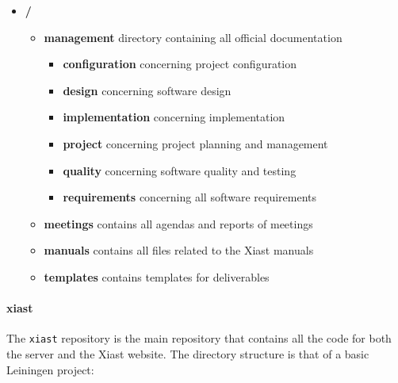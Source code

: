 \documentclass[12pt]{article}
\begin{document}
\begin{itemize}
\itemsep1pt\parskip0pt
\item
  \textbf{/}

  \begin{itemize}
  \itemsep1pt\parskip0pt
  \item
    \textbf{management} directory containing all official documentation

    \begin{itemize}
    \itemsep1pt\parskip0pt
    \item
      \textbf{configuration} concerning project configuration
    \item
      \textbf{design} concerning software design
    \item
      \textbf{implementation} concerning implementation
    \item
      \textbf{project} concerning project planning and management
    \item
      \textbf{quality} concerning software quality and testing
    \item
      \textbf{requirements} concerning all software requirements
    \end{itemize}
  \item
    \textbf{meetings} contains all agendas and reports of meetings
  \item
    \textbf{manuals} contains all files related to the Xiast manuals
  \item
    \textbf{templates} contains templates for deliverables
  \end{itemize}
\end{itemize}

\paragraph{xiast}\label{xiast}

The \texttt{xiast} repository is the main repository that contains all
the code for both the server and the Xiast website. The directory
structure is that of a basic Leiningen project:
\end{document}
